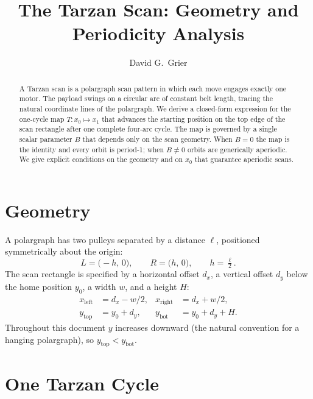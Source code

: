 \documentclass[11pt]{article}
\title{The Tarzan Scan: Geometry and Periodicity Analysis}
\author{David G.\ Grier}
\date{}
\begin{document}
\maketitle

\begin{abstract}
A Tarzan scan is a polargraph scan pattern in which each move engages
exactly one motor. The payload swings on a circular arc of constant
belt length, tracing the natural coordinate lines of the polargraph.
We derive a closed-form expression for the one-cycle map
$T\colon x_0 \mapsto x_1$ that advances the starting position on
the top edge of the scan rectangle after one complete four-arc cycle.
The map is governed by a single scalar parameter $B$ that depends
only on the scan geometry. When $B = 0$ the map is the identity and
every orbit is period-1; when $B \ne 0$ orbits are generically
aperiodic. We give explicit conditions on the geometry and on $x_0$
that guarantee aperiodic scans.
\end{abstract}

\section{Geometry}

A polargraph has two pulleys separated by a distance $\ell$,
positioned symmetrically about the origin:
\begin{equation}
  L = \bigl(-h,\,0\bigr), \qquad R = \bigl(h,\,0\bigr),
  \qquad h = \tfrac{\ell}{2}.
\end{equation}
The scan rectangle is specified by a horizontal offset $d_x$, a
vertical offset $d_y$ below the home position $y_0$, a width $w$,
and a height $H$:
\begin{align}
  x_{\mathrm{left}}  &= d_x - w/2, &
  x_{\mathrm{right}} &= d_x + w/2, \\
  y_{\mathrm{top}}   &= y_0 + d_y, &
  y_{\mathrm{bot}}   &= y_0 + d_y + H.
\end{align}
Throughout this document $y$ increases downward (the natural
convention for a hanging polargraph), so
$y_{\mathrm{top}} < y_{\mathrm{bot}}$.

\section{One Tarzan Cycle}
\end{document}
